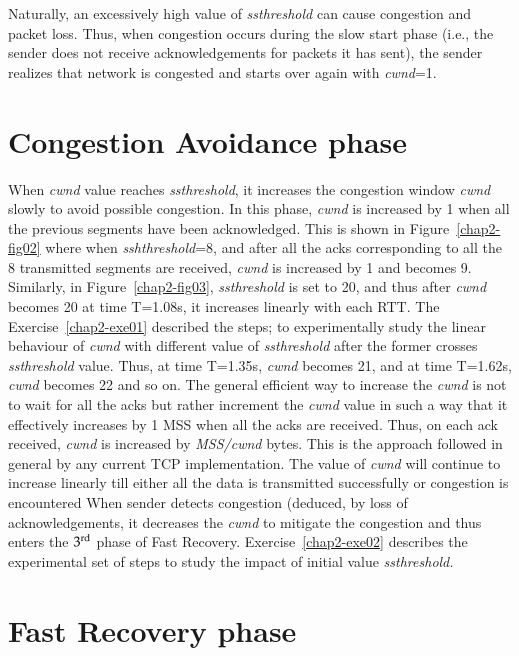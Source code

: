 \begin{multicols}{2}
Naturally, an excessively high value of \textit{ssthreshold} can cause congestion and packet loss. Thus, when congestion occurs during the slow start phase (i.e., the sender does not receive acknowledgements for packets it has sent), the sender realizes that network is congested and starts over again with \textit{cwnd}=1.

\section*{Congestion Avoidance phase}

When \textit{cwnd} value reaches \textit{ssthreshold}, it increases the congestion window \textit{cwnd} slowly to avoid possible congestion. In this phase, \textit{cwnd} is increased by 1 when all the previous segments have been acknowledged. This is shown in Figure~\ref{chap2-fig02}  where when \textit{sshthreshold}=8, and after all the acks corresponding to all the 8 transmitted segments are received, \textit{cwnd} is increased by 1 and becomes 9. Similarly, in Figure~\ref{chap2-fig03}, \textit{ssthreshold} is set to 20, and thus after \textit{cwnd} becomes 20 at time T=1.08s, it increases linearly with each RTT. The Exercise~\ref{chap2-exe01} described the steps; to experimentally study the linear behaviour of \textit{cwnd} with different value of \textit{ssthreshold} after the former crosses \textit{ssthreshold} value. Thus, at time T=1.35s, \textit{cwnd} becomes 21, and at time T=1.62s, \textit{cwnd} becomes 22 and so on. The general efficient way to increase the \textit{cwnd} is not to wait for all the acks but rather increment the \textit{cwnd} value in such a way that it effectively increases by 1 MSS when all the acks are received. Thus, on each ack received, \textit{cwnd} is increased by \textit{MSS/cwnd} bytes. This is the approach followed in general by any current TCP implementation. The value of \textit{cwnd} will continue to increase linearly till either all the data is transmitted successfully or congestion is encountered When sender detects congestion (deduced, by loss of acknowledgements, it decreases the \textit{cwnd} to mitigate the congestion and thus enters the ${\rm 3}^{\text {rd}}$ phase of Fast Recovery. Exercise~\ref{chap2-exe02} describes the experimental set of steps to study the impact of initial value \textit{ssthreshold.}

\section*{Fast Recovery phase}


\end{multicols}
